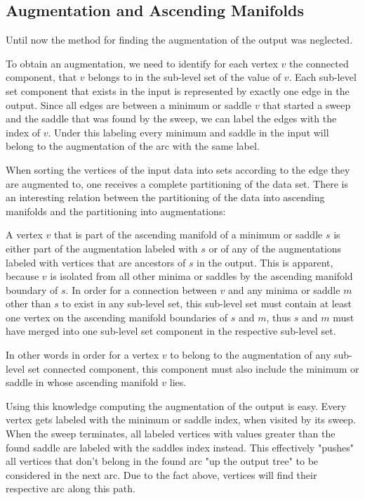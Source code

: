 \documentclass{scrartcl}
\begin{document}
\subsection{Augmentation and Ascending Manifolds}
Until now the method for finding the augmentation of the output was neglected. 

To obtain an augmentation, we need to identify for each vertex \(v\) the connected component, that \(v\) belongs to in the sub-level set of the value of \(v\). Each sub-level set component that exists in the input is represented by exactly one edge in the output. Since all edges are between a minimum or saddle \(v\) that started a sweep and the saddle that was found by the sweep, we can label the edges with the index of \(v\). Under this labeling every minimum and saddle in the input will belong to the augmentation of the arc with the same label. 

When sorting the vertices of the input data into sets according to the edge they are augmented to, one receives a complete partitioning of the data set. There is an interesting relation between the partitioning of the data into ascending manifolds and the partitioning into augmentations:

A vertex \(v\) that is part of the ascending manifold of a minimum or saddle \(s\) is either part of the augmentation labeled with \(s\) or of any of the augmentations labeled with vertices that are ancestors of \(s\) in the output. This is apparent, because \(v\) is isolated from all other minima or saddles by the ascending manifold boundary of \(s\). In order for a connection between \(v\) and any minima or saddle \(m\) other than \(s\) to exist in any sub-level set, this sub-level set must contain at least one vertex on the ascending manifold boundaries of \(s\) and \(m\), thus \(s\) and \(m\) must have merged into one sub-level set component in the respective sub-level set. 

In other words in order for a vertex \(v\) to belong to the augmentation of any sub-level set connected component, this component must also include the minimum or saddle in whose ascending manifold \(v\) lies.

Using this knowledge computing the augmentation of the output is easy. Every vertex gets labeled with the minimum or saddle index, when visited by its sweep. When the sweep terminates, all labeled vertices with values greater than the found saddle are labeled with the saddles index instead. This effectively "pushes" all vertices that don't belong in the found arc "up the output tree" to be considered in the next arc. Due to the fact above, vertices will find their respective arc along this path. 
\end{document}
